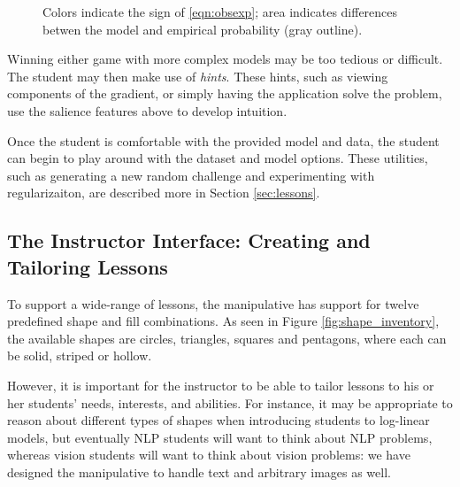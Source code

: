 \documentclass[11pt,letterpaper]{article}
\newcommand{\Commented}[1]{}
\begin{document}
\begin{figure}[t]
\caption{Colors indicate the sign of \eqref{eqn:obsexp}; area indicates 
differences betwen the model and empirical probability (gray outline).}
\label{fig:colorsize_inventory}
\end{figure}

Winning either game with more complex models may be too tedious or difficult. 
The student may then make use of \textit{hints}. These hints, such as
viewing components of the gradient, or simply having
the application solve the problem, use the salience features above to 
develop intuition.

Once the student is comfortable with the provided model and data, the student
can begin to play around with the dataset and model options. These utilities, such as
generating a new random challenge and experimenting with regularizaiton, 
are described more in Section \ref{sec:lessons}.

\subsection{The Instructor Interface: Creating and Tailoring Lessons}\label{sec:tailoring}
To support a wide-range of lessons, the manipulative has support for twelve predefined shape and fill combinations.
As seen in Figure \ref{fig:shape_inventory}, the available shapes are circles, triangles, squares and pentagons,
where each can be solid, striped or hollow.

However, it is important for the instructor to be able to tailor lessons to his or her students' needs, 
interests, and abilities. For instance, it may be appropriate to reason about different types of shapes
when introducing students to log-linear models, but eventually NLP students will want to think about 
NLP problems, whereas vision students will want to think about vision problems: we have designed the manipulative to handle text
and arbitrary images as well.\Commented{ (c.f. Figure \ref{fig:imgtxt_inventory}).}
\end{document}
